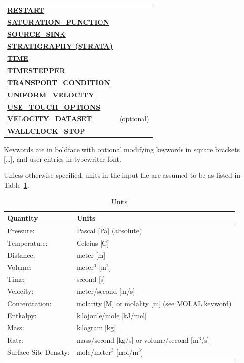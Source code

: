 \documentclass[12pt]{article}
\begin{document}
\begin{longtable}{ll}
\hyperlink{target_restart}{\bf RESTART} & \\
\hyperlink{target_sat}{\bf SATURATION\_FUNCTION} & \\
\hyperlink{target_src}{\bf SOURCE\_SINK} & \\
\hyperlink{target_strata}{\bf STRATIGRAPHY (STRATA)} & \\
\hyperlink{target_time}{\bf TIME} & \\
\hyperlink{target_timestep}{\bf TIMESTEPPER} & \\
\hyperlink{target_trans_cond}{\bf TRANSPORT\_CONDITION} & \\
\hyperlink{target_unifvel}{\bf UNIFORM\_VELOCITY} & \\
\hyperlink{target_touch}{\bf USE\_TOUCH\_OPTIONS} & \\
\hyperlink{target_veldata}{\bf VELOCITY\_DATASET} & (optional) \\
\hyperlink{target_wallclk}{\bf WALLCLOCK\_STOP} & \\
\bottomrule[1.5pt]
\end{longtable}


 Keywords are in boldface with optional modifying keywords in square brackets [\ldots], and user entries in typewriter font.

Unless otherwise specified, units in the input file are assumed to be as listed in Table~\ref{tunits}.

\begin{table}[h]\centering
\caption{Units}\label{tunits}

\vspace{3mm}

\begin{tabular}{ll}
\toprule[2pt]
Quantity & Units\\
\midrule[1pt]
Pressure: & Pascal [Pa] (absolute)\\
Temperature: & Celcius [C]\\
Distance: & meter [m]\\
Volume: & meter$^3$ [m$^3$]\\
Time: & second [s]\\
Velocity: & meter/second [m/s]\\
Concentration: & molarity [M] or molality [m] (see MOLAL keyword)\\
Enthalpy: & kilojoule/mole [kJ/mol]\\
Mass: & kilogram [kg]\\
Rate: & mass/second [kg/s] or volume/second [m$^3$/s]\\
Surface Site Density: & mole/meter$^{3}$ [mol/m$^{3}$]\\
\bottomrule[1.5pt]
\end{tabular}
\end{table}
\end{document}
